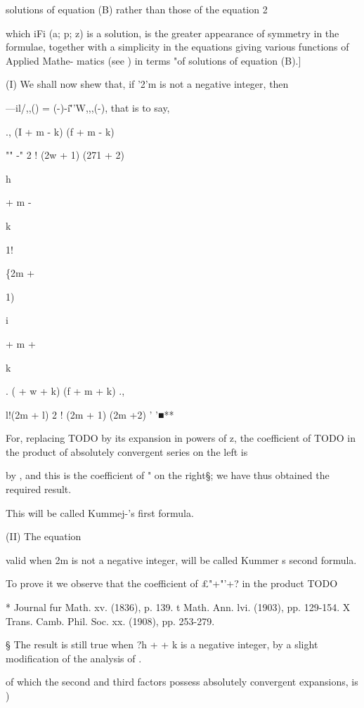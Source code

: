 solutions of equation (B) rather than those of the equation 2

which iFi (a; p; z) is a solution, is the greater appearance of
symmetry in the formulae, together with a simplicity in the equations
giving various functions of Applied Mathe- matics (see ) in
terms "of solutions of equation (B).]


(I) We shall now shew that, if '2'm is not a negative integer, then

---il/,,() = (-)-i\~''W,,,(-), that is to say,

., (I + m - k) (f + m - k)

 "" -" 2 ! (2w + 1) (271 + 2)

h

+ m -

k

1!

\{2m +

1)

i

+ m +

k

  . ( + w + k) (f + m + k) .,

l!(2m + l) 2 ! (2m + 1) (2m +2) ' '■**

For, replacing TODO by its expansion in powers of z, the coefficient
of TODO in the product of absolutely convergent series on the left is

by , and this is the coefficient of " on the right§; we have
thus obtained the required result.

This will be called Kummej-'s first formula.

(II) The equation

valid when 2m is not a negative integer, will be called Kummer s
second formula.

To prove it we observe that the coefficient of £"+"'+? in the product
TODO

* Journal fur Math. xv. (1836), p. 139. t Math. Ann. lvi. (1903), pp.
129-154. X Trans. Camb. Phil. Soc. xx. (1908), pp. 253-279.

§ The result is still true when ?h +  + k is a negative integer, by
a slight modification of the analysis of .

%
%

of which the second and third factors possess absolutely convergent
expansions, is )

